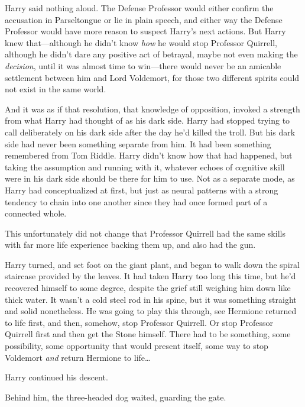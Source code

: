 Harry said nothing aloud. The Defense Professor would either confirm the accusation in Parseltongue or lie in plain speech, and either way the Defense Professor would have more reason to suspect Harry's next actions. But Harry knew that—although he didn't know \emph{how} he would stop Professor Quirrell, although he didn't dare any positive act of betrayal, maybe not even making the \emph{decision}, until it was almost time to win—there would never be an amicable settlement between him and Lord Voldemort, for those two different spirits could not exist in the same world.

And it was as if that resolution, that knowledge of opposition, invoked a strength from what Harry had thought of as his dark side. Harry had stopped trying to call deliberately on his dark side after the day he'd killed the troll. But his dark side had never been something separate from him. It had been something remembered from Tom Riddle. Harry didn't know how that had happened, but taking the assumption and running with it, whatever echoes of cognitive skill were in his dark side should be there for him to use. Not as a separate mode, as Harry had conceptualized at first, but just as neural patterns with a strong tendency to chain into one another since they had once formed part of a connected whole.

This unfortunately did not change that Professor Quirrell had the same skills with far more life experience backing them up, and also had the gun.

Harry turned, and set foot on the giant plant, and began to walk down the spiral staircase provided by the leaves. It had taken Harry too long this time, but he'd recovered himself to some degree, despite the grief still weighing him down like thick water. It wasn't a cold steel rod in his spine, but it was something straight and solid nonetheless. He was going to play this through, see Hermione returned to life first, and then, somehow, stop Professor Quirrell. Or stop Professor Quirrell first and then get the Stone himself. There had to be something, some possibility, some opportunity that would present itself, some way to stop Voldemort \emph{and} return Hermione to life{\ldots}

Harry continued his descent.

Behind him, the three-headed dog waited, guarding the gate.

